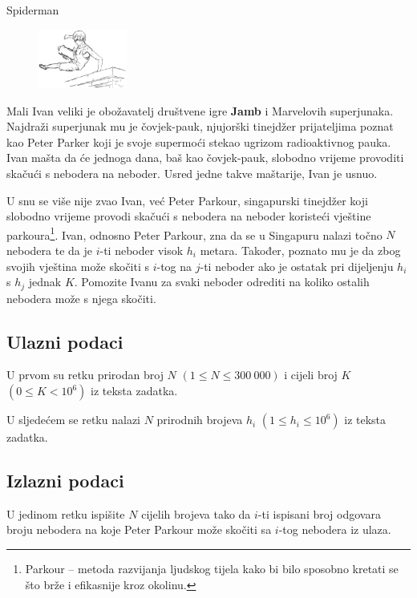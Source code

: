 \begin{statement}[
  problempoints=70,
  timelimit=2 sekunde,
  memorylimit=512 MiB,
]{Spiderman}

\setlength\intextsep{-0.1cm}
\begin{figure}
\centering
\includegraphics[width=0.26\textwidth]{img/spiderman.png}
\end{figure}

Mali Ivan veliki je obožavatelj društvene igre \textbf{Jamb} i Marvelovih
superjunaka.  Najdraži superjunak mu je čovjek-pauk, njujorški tinejdžer
prijateljima poznat kao Peter Parker koji je svoje supermoći stekao ugrizom
radioaktivnog pauka. Ivan mašta da će jednoga dana, baš kao čovjek-pauk,
slobodno vrijeme provoditi skačući s nebodera na neboder.  Usred jedne takve
maštarije, Ivan je usnuo.

U snu se više nije zvao Ivan, već Peter Parkour, singapurski tinejdžer koji
slobodno vrijeme provodi skačući s nebodera na neboder koristeći vještine
parkoura\footnote{Parkour -- metoda razvijanja ljudskog tijela kako bi bilo
sposobno kretati se što brže i efikasnije  kroz okolinu.}. Ivan, odnosno
Peter Parkour, zna da se u Singapuru nalazi točno $N$ nebodera te da je
$i$-ti neboder visok $h_i$ metara. Također, poznato mu je da zbog svojih
vještina može skočiti s $i$-tog na $j$-ti neboder ako je ostatak pri
dijeljenju $h_i$ s $h_j$ jednak $K$.  Pomozite Ivanu za svaki neboder
odrediti na koliko ostalih nebodera može s njega skočiti.

\subsection*{Ulazni podaci}
U prvom su retku prirodan broj $N$ $(1 \le N \le 300\ 000)$ i cijeli broj $K$
$(0 \le K < 10^6)$ iz teksta zadatka.

U sljedećem se retku nalazi $N$ prirodnih brojeva $h_i$ $(1 \le h_i \le 10^6)$
iz teksta zadatka.

\subsection*{Izlazni podaci}
U jedinom retku ispišite $N$ cijelih brojeva tako da $i$-ti ispisani broj
odgovara broju nebodera na koje Peter Parkour može skočiti sa $i$-tog
nebodera iz ulaza.


\end{statement}

